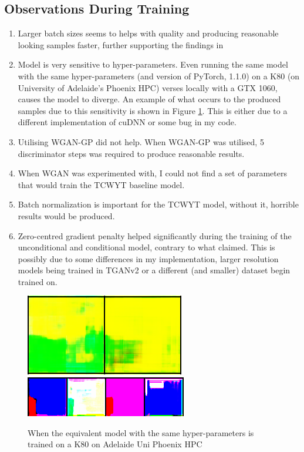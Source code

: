 \documentclass{report}
\theoremstyle{plain}
\theoremstyle{definition}
\theoremstyle{remark}
\numberwithin{equation}{section}
\numberwithin{figure}{section}
\newcommand{\<}{\langle}
\renewcommand{\>}{\rangle}
\begin{document}
\subsection{Observations During Training}

\begin{enumerate}
    \item Larger batch sizes seems to helps with quality and producing reasonable looking samples faster, further supporting the findings in \cite{brock_large_2018,saito_tganv2:_2018}
    \item Model is very sensitive to hyper-parameters. Even running the same model with the same hyper-parameters (and version of PyTorch, 1.1.0) on a K80 (on University of Adelaide's Phoenix HPC) verses locally with a GTX 1060, causes the model to diverge. An example of what occurs to the produced samples due to this sensitivity is shown in Figure \ref{fig:wtf_samples}. This is either due to a different implementation of cuDNN or some bug in my code.
    \item Utilising WGAN-GP \cite{heusel_gans_2017} did not help. When WGAN-GP \cite{heusel_gans_2017} was utilised, 5 discriminator steps was required to produce reasonable results.
    \item When WGAN \cite{arjovsky_wasserstein_2017} was experimented with, I could not find a set of parameters that would train the TCWYT baseline model.
    \item Batch normalization \cite{ioffe_batch_2015} is important for the TCWYT \cite{pan_create_2018} model, without it, horrible results would be produced.
    \item Zero-centred gradient penalty \cite{saito_tganv2:_2018} helped significantly during the training of the unconditional and conditional model, contrary to what \cite{saito_tganv2:_2018} claimed. This is possibly due to some differences in my implementation, larger resolution models being trained in TGANv2 or a different (and smaller) dataset begin trained on.
\end{enumerate}

\begin{figure}[H] \label{fig:wtf_samples}
    \centering
    \caption{When the equivalent model with the same hyper-parameters is trained on a K80 on Adelaide Uni Phoenix HPC}
    \includegraphics[width=0.4\linewidth]{images/wtf_1.png}\\
    \includegraphics[width=0.8\linewidth]{images/wtf_2.png}\\
\end{figure}
\end{document}
